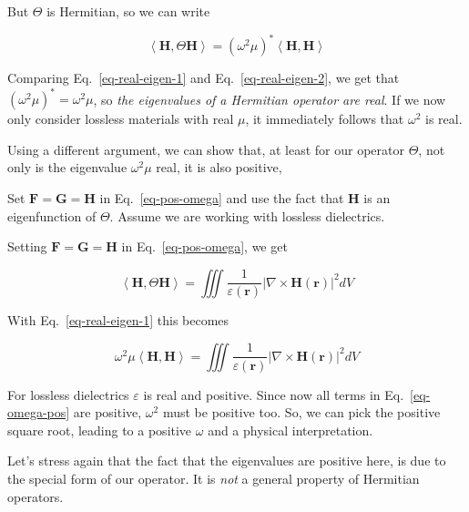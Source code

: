 But $\Theta$ is Hermitian, so we can write

\begin{equation}
\left\langle {\mathbf H} , \Theta {\mathbf H} \right\rangle  = (\omega^2 \mu)^* \left\langle {\mathbf H} , {\mathbf H}\right\rangle \label{eq-real-eigen-2}
\end{equation} 

Comparing Eq.~\ref{eq-real-eigen-1} and Eq.~\ref{eq-real-eigen-2}, we get that $(\omega^2 \mu)^* = \omega^2 \mu$, so \emph{the eigenvalues of a Hermitian operator are real}. If we now only consider lossless materials with real $\mu$, it immediately follows that $\omega^2$ is real.




Using a different argument, we can show that, at least for our operator $\Theta$, not only is the eigenvalue $\omega^2 \mu$ real, it is also positive, 

\begin{cue}
Set ${\mathbf F}={\mathbf G}={\mathbf H}$ in Eq.~\ref{eq-pos-omega} and use the fact that $\mathbf H$ is an eigenfunction of $\Theta$. Assume we are working with lossless dielectrics.
\end{cue}

Setting ${\mathbf F}={\mathbf G}={\mathbf H}$ in Eq.~\ref{eq-pos-omega}, we get

\begin{equation}
\left\langle {\mathbf H}, \Theta {\mathbf H}\right\rangle = \iiint \frac{1}{\varepsilon({\mathbf r})} \left | \nabla \times {\mathbf H({\mathbf r})} \right |^2  dV 
\label{eq-rot-H-bis}
\end{equation} 

With Eq.~\ref{eq-real-eigen-1} this becomes

\begin{equation}
\omega^2 \mu \left\langle {\mathbf H} , {\mathbf H}\right\rangle = \iiint \frac{1}{\varepsilon({\mathbf r})} \left | \nabla \times {\mathbf H({\mathbf r})} \right |^2  dV \label{eq-omega-pos}
\end{equation} 

For lossless dielectrics $\varepsilon$ is real and positive. Since now all terms in Eq.~\ref{eq-omega-pos} are positive, $\omega^2$ must be positive too. So, we can pick the positive square root, leading to a positive $\omega$ and a physical interpretation.

Let's stress again that the fact that the eigenvalues are positive here, is due to the special form of our operator. It is \emph{not} a general property of Hermitian operators.



